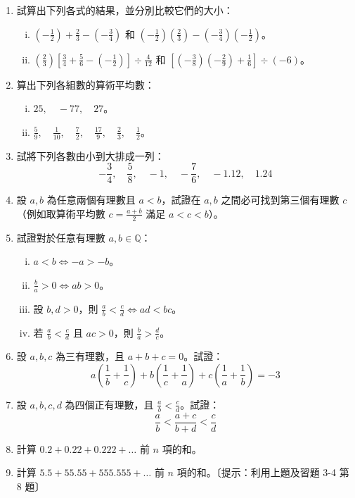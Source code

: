 \begin{enumerate}[1., leftmargin=2em]
  \item 試算出下列各式的結果，並分別比較它們的大小：
  \begin{enumerate}[(i)]
    \item $\left(-\frac{1}{2}\right) + \frac{2}{3} - \left(-\frac{3}{4}\right)$ 和 $\left(-\frac{1}{2}\right)\left(\frac{2}{3}\right) - \left(-\frac{3}{4}\right)\left(-\frac{1}{2}\right)$。
    \item $\left(\frac{2}{3}\right)\left[\frac{3}{4} + \frac{5}{6} - \left(-\frac{1}{2}\right)\right] \div \frac{4}{12}$ 和 $\left[\left(-\frac{3}{8}\right)\left(-\frac{2}{9}\right) + \frac{1}{6}\right] \div (-6)$。
  \end{enumerate}
  \item 算出下列各組數的算術平均數：
  \begin{enumerate}[(i)]
    \item $25, \quad -77, \quad 27$。
    \item $\frac{5}{9}, \quad \frac{1}{10}, \quad \frac{7}{2}, \quad \frac{17}{9}, \quad \frac{2}{3}, \quad \frac{1}{2}$。
  \end{enumerate}
  \item 試將下列各數由小到大排成一列：
  \begin{equation*}
    -\frac{3}{4}, \quad \frac{5}{8}, \quad -1, \quad -\frac{7}{6}, \quad -1.12, \quad 1.24
  \end{equation*}
  \item 設 $a, b$ 為任意兩個有理數且 $a < b$，試證在 $a, b$ 之間必可找到第三個有理數 $c$（例如取算術平均數 $c = \frac{a+b}{2}$ 滿足 $a < c < b$）。
  \item 試證對於任意有理數 $a, b \in \mathbb{Q}$：
  \begin{enumerate}[(i)]
    \item $a < b \iff -a > -b$。
    \item $\frac{b}{a} > 0 \iff ab > 0$。
    \item 設 $b, d > 0$，則 $\frac{a}{b} < \frac{c}{d} \iff ad < bc$。
    \item 若 $\frac{a}{b} < \frac{c}{d}$ 且 $ac > 0$，則 $\frac{b}{a} > \frac{d}{c}$。
  \end{enumerate}
  \item 設 $a, b, c$ 為三有理數，且 $a+b+c=0$。試證：
  \begin{equation*}
    a\left(\frac{1}{b} + \frac{1}{c}\right) + b\left(\frac{1}{c} + \frac{1}{a}\right) + c\left(\frac{1}{a} + \frac{1}{b}\right) = -3
  \end{equation*}
  \item 設 $a, b, c, d$ 為四個正有理數，且 $\frac{a}{b} < \frac{c}{d}$。試證：
  \begin{equation*}
    \frac{a}{b} < \frac{a+c}{b+d} < \frac{c}{d}
  \end{equation*}
  \item 計算 $0.2 + 0.22 + 0.222 + \dots$ 前 $n$ 項的和。
  \item 計算 $5.5 + 55.55 + 555.555 + \dots$ 前 $n$ 項的和。〔提示：利用上題及習題 3-4 第 8 題〕
\end{enumerate}

